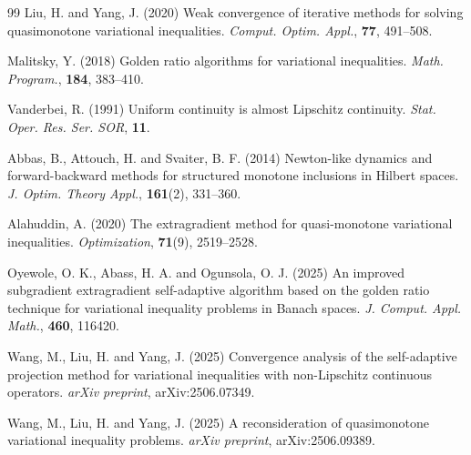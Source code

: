 \documentclass[hidelinks,11 pt]{article}
\numberwithin{equation}{section}
\theoremstyle{definition}  %
\numberwithin{equation}{section}
\numberwithin{theorem}{section}
\begin{document}
\begin{thebibliography}{99}
Liu, H. and Yang, J. (2020) Weak convergence of iterative methods for solving quasimonotone variational inequalities. \textit{Comput. Optim. Appl.}, \textbf{77}, 491--508.

Malitsky, Y. (2018) Golden ratio algorithms for variational inequalities. \textit{Math. Program.}, \textbf{184}, 383--410.

Vanderbei, R. (1991) Uniform continuity is almost Lipschitz continuity. \textit{Stat. Oper. Res. Ser. SOR}, \textbf{11}.

Abbas, B., Attouch, H. and Svaiter, B. F. (2014) Newton-like dynamics and forward-backward methods for structured monotone inclusions in Hilbert spaces. \textit{J. Optim. Theory Appl.}, \textbf{161}(2), 331--360.

Alahuddin, A. (2020) The extragradient method for quasi-monotone variational inequalities. \textit{Optimization}, \textbf{71}(9), 2519--2528.

Oyewole, O. K., Abass, H. A. and Ogunsola, O. J. (2025) An improved subgradient extragradient self-adaptive algorithm based on the golden ratio technique for variational inequality problems in Banach spaces. \textit{J. Comput. Appl. Math.}, \textbf{460}, 116420.

Wang, M., Liu, H. and Yang, J. (2025) Convergence analysis of the self-adaptive projection method for variational inequalities with non-Lipschitz continuous operators. \textit{arXiv preprint}, arXiv:2506.07349.

Wang, M., Liu, H. and Yang, J. (2025) A reconsideration of quasimonotone variational inequality problems. \textit{arXiv preprint}, arXiv:2506.09389.

\end{thebibliography}
\end{document}
